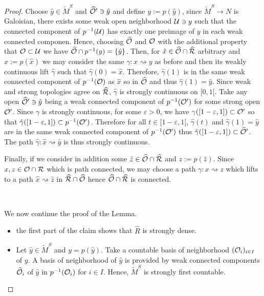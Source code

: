 \begin{proof}
Choose $\hat y\in \widetilde M^S$ and $\widehat {\mathcal{O}}'\ni \hat y$ and define $y:=p(\hat y)$, since $\widetilde M^S\rightarrow N$ is Galoisian, there exists some weak open neighborhood $\mathcal{U}\ni y$ such that the connected component of $p^{-1}(\mathcal{U})$ has exactly one preimage of $y$ in each weak connected componen. Hence, choosing $\widehat {\mathcal{O}}$ and $\mathcal{O}$ with the additional property that $\mathcal{O}\subset \mathcal{U}$ we have $\widehat {\mathcal{O}}\cap p^{-1}(y)=\{\hat y\}$. Then, for  $\hat x\in \widehat {\mathcal{O}}\cap \widehat {\mathcal R}$ arbitrary and $x:=p(\hat x)$ we may consider the same $\gamma : x\rightsquigarrow y$ as before and then its weakly continuous lift $\hat \gamma$ such that $\hat \gamma(0)=\hat x$. Therefore, $\hat\gamma(1)$ is in the same weak connected component of $p^{-1}(\mathcal{O})$ as $\hat x$ so in $\widehat {\mathcal{O}}$ and thus $\hat \gamma(1)=\hat y$.
Since  weak and strong topologies agree on $\widehat{\mathcal R}$, $\hat\gamma$ is strongly continuous on $[0,1[$. Take any open $\widehat {\mathcal{O}}'\ni \hat y$  being a weak connected component of $p^{-1}(\mathcal{O}')$ for some strong open $\mathcal{O}'$. Since $\gamma$ is strongly continuous, for some $\varepsilon>0$, we have $\gamma([1-\varepsilon,1])\subset \mathcal{O}'$ so that $\hat\gamma([1-\varepsilon,1])\subset p^{-1}(\mathcal{O}') $. Therefore for all $t\in [1-\varepsilon,1[$, $\hat \gamma(t)$ and $\hat\gamma(1)=\hat y$ are in the same weak connected component of $p^{-1}(\mathcal{O}')$ thus $\hat\gamma([1-\varepsilon,1])\subset \widehat {\mathcal{O}}'$. The path $\hat \gamma : \hat x\rightsquigarrow \hat y$ is thus strongly continuous.

Finally, if we consider in addition some $\hat z\in \widehat {\mathcal{O}}\cap \widehat {\mathcal R}$ and $z:= p(\hat z)$. Since $x,z \in \mathcal{O}
\cap \mathcal R$ which is path connected, we may choose a path $\gamma :x \rightsquigarrow z$ which lifts to a path $\hat x\rightsquigarrow \hat z$ in $\widehat {\mathcal R} \cap \widehat{\mathcal{O}}$ hence $\widehat {\mathcal{O}} \cap \widehat {\mathcal R}$ is connected.



\

We now continue the proof of the Lemma.
\begin{itemize}
\item the first part of the claim shows that $\widehat R$ is strongly dense.
 \item Let $\hat y\in \widetilde M^S$ and $y=p(\hat y)$. Take a countable basis of neighborhood $(\mathcal{O}_i)_{i\in I}$ of $y$. A basis of neighborhood of $\hat y$ is provided by weak connected components $\widehat {\mathcal{O}}_i$ of $\hat y$ in  $p^{-1}(\mathcal{O}_i)$ for $i
 \in I$. Hence, $\widetilde M^S$ is strongly first countable.
 

\end{itemize}
\end{proof}
